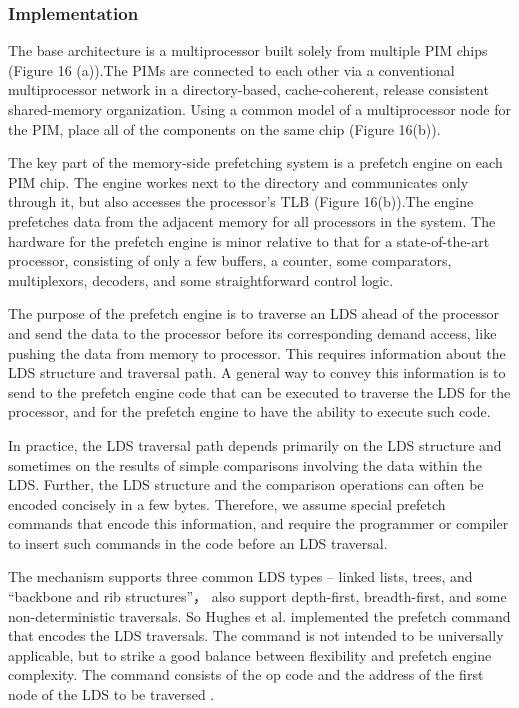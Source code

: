 \documentclass{acm_proc_article-sp}
\begin{document}
\subsubsection{Implementation}
The base architecture is a multiprocessor built solely from 
multiple PIM chips (Figure 16 (a)).The PIMs are connected 
to each other via a conventional multiprocessor network in a
directory-based, cache-coherent, release consistent shared-memory
organization. Using a common model of a
multiprocessor node for the PIM, place all of 
the components on the same chip (Figure 16(b)).

The key part of the memory-side prefetching system is a prefetch
engine on each PIM chip. The engine workes next to the directory and
communicates only 
through it, but also accesses the 
processor’s TLB (Figure 16(b)).The engine prefetches data from the
adjacent memory for all processors in the system. The hardware for the 
prefetch engine is minor relative to that 
for a state-of-the-art processor, consisting of only a few buffers, a
counter, some comparators, multiplexors, 
decoders, and some straightforward control logic.

The purpose of the prefetch engine is to traverse an LDS ahead of the
processor and send the data to the processor 
before its corresponding demand access, like pushing the data from
memory to processor. 
This requires information about the LDS structure and traversal 
path. A general way to convey this information is  to
send to the prefetch engine code that 
can be executed to traverse the LDS for the processor, and for the
prefetch engine to have the ability to execute such code.
 

In practice, the LDS traversal path depends primarily 
on the LDS structure and sometimes on the results of simple
comparisons involving the data within the LDS. 
Further, the LDS structure and the comparison operations can often be
encoded concisely in a few bytes. 
Therefore,  we assume special prefetch commands that encode this
information, and require the programmer or compiler to insert such
commands in the code before an LDS traversal. 

The mechanism supports three common LDS types – linked lists, trees,
and “backbone and rib structures”， also support depth-first,
breadth-first, and some non-deterministic traversals. So Hughes et
al. implemented the prefetch command that encodes the LDS
traversals. The command is not intended to be universally applicable, 
but to strike a good balance between flexibility and prefetch engine complexity.
The command consists of the op code and the address of the first node
of the LDS to be traversed . 
\end{document}
